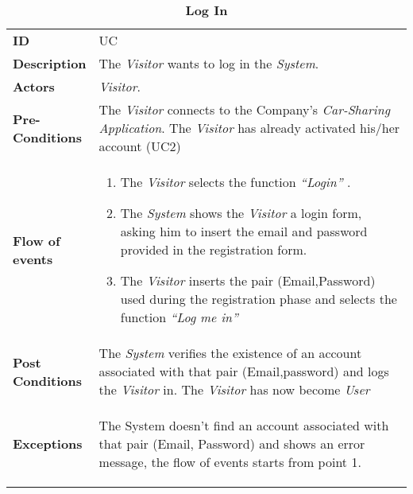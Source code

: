 \begin{longtable}{|p{0.2\linewidth} p{0.8\linewidth}|}
	\captionsetup{labelformat=empty} %
	\caption{\textbf{Log In}} %
	\label{UC_Login}%
	\\ \hline %
	
	\textbf{ID} & UC\theUseCaseIdCounter \\ \hline
	\textbf{Description} & The \emph{Visitor} wants to log in the \emph{System}. \\ \hline
	\textbf{Actors} & \emph{Visitor}.\\ \hline
	\textbf{Pre-Conditions} & The \emph{Visitor} connects to the Company's \emph{Car-Sharing Application}.
	 The \emph{Visitor} has already activated his/her account (UC2) \\ \hline
	\textbf{Flow of events} & 
	\begin{enumerate}
		\item The \emph{Visitor} selects the function \textit{\textquotedblleft{Login}\textquotedblright} .
		\item The \emph{System} shows the \emph{Visitor} a login form, asking him to insert the email and password provided in the registration form.
		\item The \emph{Visitor} inserts the pair (Email,Password) used during the registration phase and selects the function \textit{\textquotedblleft{Log me in}\textquotedblright}
	\end{enumerate}	 \\ \hline
	\textbf{Post Conditions} & The \emph{System} verifies the existence of an account associated with that pair (Email,password) and logs the \emph{Visitor} in. The \emph{Visitor} has now become \emph{User}  \\ \hline
	\textbf{Exceptions} & 
	\begin{itemize}
	The System doesn’t find an account associated with that pair (Email, Password) and   shows an error message, the flow of events starts from point 1.
	\end{itemize} \\ \hline
\end{longtable}

